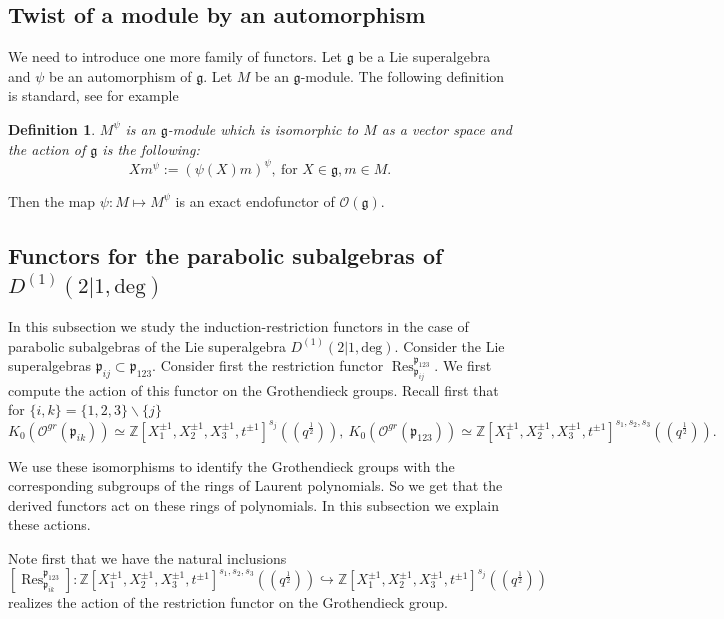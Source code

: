 \documentclass[10pt]{amsart}
\newtheorem{definition}[theorem]{Definition}
\newcommand{\fg}{{\mathfrak g}}
\newcommand{\fp}{{\mathfrak p}}
\newcommand{\Daff}{D^{(1)}(2|1,\mathrm{deg})}
\DeclareMathOperator{\Res}{Res}
\begin{document}
	\subsection{Twist of a module by an automorphism}
	We need to introduce one more family of functors. Let $\fg$ be a Lie superalgebra and $\psi$ be an automorphism of $\fg$. Let $M$ be an $\fg$-module. The following definition is standard, see for example
	\begin{definition}\label{def:TwistedModule}
		$M^\psi$ is an $\fg$-module which is isomorphic to $M$ as a vector space and the action of $\fg$ is the following:
		\[X m^\psi:=(\psi(X)m)^\psi, ~\text{for }X \in \fg, m \in M.\]
	\end{definition}
	
	Then the map $\psi: M \mapsto M^{\psi}$ is an exact endofunctor of $\mathcal{O}(\fg)$.
	
	\subsection{Functors for the parabolic subalgebras of \texorpdfstring{$\Daff$}{Daff}}
	
	In this subsection we study the induction-restriction functors in the case of parabolic subalgebras of the Lie superalgebra $\Daff$. Consider the Lie superalgebras $\fp_{ij}\subset \fp_{123}$. Consider first the restriction functor
	$\Res_{\fp_{ij}}^{\fp_{123}}$. We first compute the action of this functor on the Grothendieck groups. Recall first that for $\{i,k\}=\{1,2,3\}\backslash\{j\}$
	\[K_0(\mathcal{O}^{gr}(\fp_{ik}))\simeq\mathbb{Z}[X_1^{\pm 1},X_2^{\pm 1},X_3^{\pm 1},t^{\pm 1}]^{s_j}((q^{\frac{1}{2}})),~K_0(\mathcal{O}^{gr}(\fp_{123}))\simeq\mathbb{Z}[X_1^{\pm 1},X_2^{\pm 1},X_3^{\pm 1},t^{\pm 1}]^{s_1,s_2,s_3}((q^{\frac{1}{2}})).\]  
	
	We use these isomorphisms to identify the Grothendieck groups with the corresponding subgroups of the rings of Laurent polynomials. So we get that the derived functors act on these rings of polynomials. In this subsection we explain these actions. 
	
	Note first that we have the natural inclusions
	\[[\Res_{\fp_{ik}}^{\fp_{123}}]:\mathbb{Z}[X_1^{\pm 1},X_2^{\pm 1},X_3^{\pm 1},t^{\pm 1}]^{s_1,s_2,s_3}((q^{\frac{1}{2}}))\hookrightarrow \mathbb{Z}[X_1^{\pm 1},X_2^{\pm 1},X_3^{\pm 1},t^{\pm 1}]^{s_j}((q^{\frac{1}{2}}))\]
	realizes the action of the restriction functor on the Grothendieck group. 
	
\end{document}
